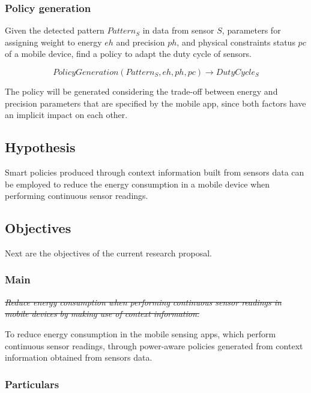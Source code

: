 \documentclass{report}
\begin{document}
\subsubsection{Policy generation}

Given the detected pattern $Pattern_{S}$ in data from sensor $S$, parameters for assigning weight to energy $eh$ and precision $ph$, and physical constraints status $pc$ of a mobile device, find a policy to adapt the duty cycle of sensors.

\begin{equation}
  PolicyGeneration( Pattern_{S}, eh, ph, pc ) \longrightarrow{} DutyCycle_{S}
\end{equation}

The policy will be generated considering the trade-off between energy and precision parameters that are specified by the mobile app, since both factors have an implicit impact on each other.

\subsection{Hypothesis}

Smart policies produced through context information built from sensors data can be employed to reduce the energy consumption in a mobile device when performing continuous sensor readings.

\subsection{Objectives}
Next are the objectives of the current research proposal.

\subsubsection{Main}

\emph{\sout{Reduce energy consumption when performing continuous sensor readings in mobile devices by making use of context information.}}

To reduce energy consumption in the mobile sensing apps, which perform continuous sensor readings, through power-aware policies generated from context information obtained from sensors data.
\subsubsection{Particulars}
\end{document}
